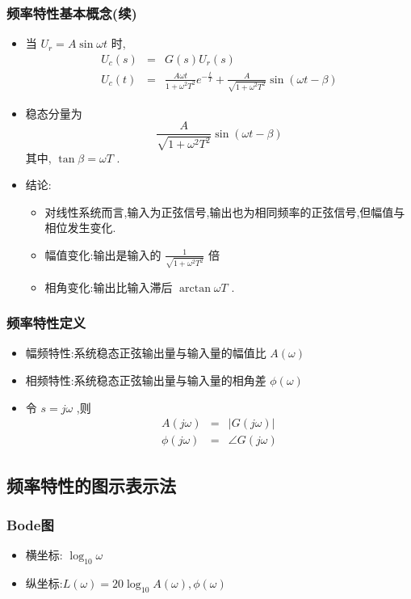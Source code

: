 \documentclass[table]{beamer}
\begin{document}
\subsubsection{频率特性基本概念(续)}
\label{sec:orgd4eaee9}
\begin{itemize}
\item <2->当 \(U_r=A\sin\omega t\) 时,
\begin{eqnarray*}
U_c(s) & =& G(s)U_r(s)\\
U_c(t) &=& \frac{A\omega t}{1+\omega^2 T^2}e^{-\frac{t}{T}}+\frac{A}{\sqrt{1+\omega^2 T^2}}\sin(\omega t-\beta)
\end{eqnarray*}
\item <3->稳态分量为 
\[\frac{A}{\sqrt{1+\omega^2 T^2}}\sin(\omega t-\beta)\]
 其中, \(\tan\beta=\omega T\) .
\item <4->结论:
\begin{itemize}
\item <4->对线性系统而言,输入为正弦信号,输出也为相同频率的正弦信号,但幅值与相位发生变化.
\item <5->幅值变化:输出是输入的  \(\frac{1}{\sqrt{1+\omega^2 T^2}}\)  倍
\item <6->相角变化:输出比输入滞后  \(\arctan \omega T\)  .
\end{itemize}
\end{itemize}
\subsubsection{频率特性定义}
\label{sec:org9a58f28}
\begin{itemize}
\item <2->幅频特性:系统稳态正弦输出量与输入量的幅值比  \(A(\omega)\)
\item <3->相频特性:系统稳态正弦输出量与输入量的相角差  \(\phi(\omega)\)
\item <4->令  \(s=j\omega\)  ,则
\begin{eqnarray*}
A(j\omega)&=&|G(j\omega)|  \\
\phi(j\omega) &=& \angle G(j\omega)
\end{eqnarray*}
\end{itemize}
\subsection{频率特性的图示表示法}
\label{sec:org7e01d02}
\subsubsection{Bode图}
\label{sec:org1fab889}
\begin{itemize}
\item <2->横坐标:  \(\log_{10}\omega\)
\item <2->纵坐标:\(L(\omega)=20\log_{10}A(\omega),\phi(\omega)\)
\end{itemize}
\end{document}
